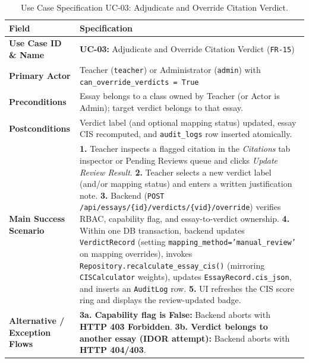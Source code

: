 \begin{table}[!htbp]
\centering
\caption{Use Case Specification UC-03: Adjudicate and Override Citation Verdict.}\label{tab:uc03}
\begin{tabular}{|L{0.24}|L{0.76}|}
\hline
\textbf{Field} & \textbf{Specification} \\
\hline
\textbf{Use Case ID \& Name} & \textbf{UC-03:} Adjudicate and Override Citation Verdict (\texttt{FR-15}) \\
\hline
\textbf{Primary Actor} & Teacher (\texttt{teacher}) or Administrator (\texttt{admin}) with \texttt{can\_override\_verdicts = True} \\
\hline
\textbf{Preconditions} & Essay belongs to a class owned by Teacher (or Actor is Admin); target verdict belongs to that essay. \\
\hline
\textbf{Postconditions} & Verdict label (and optional mapping status) updated, essay CIS recomputed, and \texttt{audit\_logs} row inserted atomically. \\
\hline
\textbf{Main Success Scenario} & \textbf{1.} Teacher inspects a flagged citation in the \textit{Citations} tab inspector or Pending Reviews queue and clicks \textit{Update Review Result}. \newline \textbf{2.} Teacher selects a new verdict label (and/or mapping status) and enters a written justification note. \newline \textbf{3.} Backend (\texttt{POST /api/essays/\{id\}/verdicts/\{vid\}/override}) verifies RBAC, capability flag, and essay-to-verdict ownership. \newline \textbf{4.} Within one DB transaction, backend updates \texttt{VerdictRecord} (setting \texttt{mapping\_method='manual\_review'} on mapping overrides), invokes \texttt{Repository.recalculate\_essay\_cis()} (mirroring \texttt{CISCalculator} weights), updates \texttt{EssayRecord.\allowbreak{}cis\_json}, and inserts an \texttt{AuditLog} row. \newline \textbf{5.} UI refreshes the CIS score ring and displays the review-updated badge. \\
\hline
\textbf{Alternative / Exception Flows} & \textbf{3a. Capability flag is False:} Backend aborts with \textbf{HTTP 403 Forbidden}. \newline \textbf{3b. Verdict belongs to another essay (IDOR attempt):} Backend aborts with \textbf{HTTP 404/403}. \\
\hline
\end{tabular}
\end{table}

